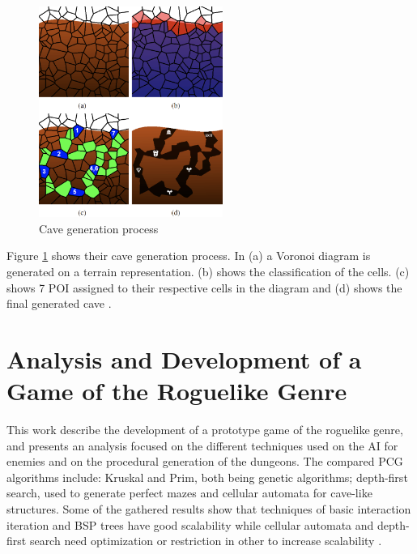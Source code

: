 \begin{figure}[h]
    \caption{Cave generation process}
    \centerline{\includegraphics[width=6cm]{images/related_work/poi_cave.png}}
    \label{fig:poi_cave}
\end{figure}

Figure \ref{fig:poi_cave} shows their cave generation process. In (a) a Voronoi diagram is generated on a terrain representation. (b) shows the classification of the cells. (c) shows 7 POI assigned to their respective cells in the diagram and (d) shows the final generated cave \citeyear{santamaria:2014}.

\section{Analysis and Development of a
Game of the Roguelike Genre}

This work describe the development of a prototype game of the roguelike genre, and presents an analysis focused on the different techniques used on the AI for enemies and on the procedural generation of the dungeons. The compared PCG algorithms include: Kruskal and Prim, both being genetic algorithms; depth-first search, used to generate perfect mazes and cellular automata for cave-like structures. Some of the gathered results show that techniques of basic interaction iteration and BSP trees have good scalability while cellular automata and depth-first search need optimization or restriction in other to increase scalability \cite{goncalves:2015}.
